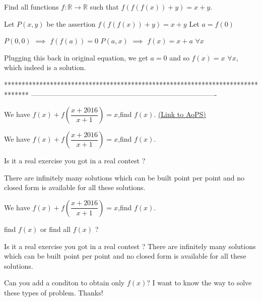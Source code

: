 \begin{solution}
	\begin{tcolorbox}Find all  functions $f: \mathbb{R}\to\mathbb{R}$ such that $f(f(f(x))+y)=x+y$.\end{tcolorbox}
Let $P(x,y)$ be the assertion $f(f(f(x))+y)=x+y$
Let $a=f(0)$

$P(0,0)$ $\implies$ $f(f(a))=0$
$P(a,x)$ $\implies$ $f(x)=x+a$  $\forall x$

Plugging this back in original equation, we get $a=0$ and so $\boxed{f(x)=x}$ $\forall x$, which indeed is a solution.
\end{solution}
*******************************************************************************
-------------------------------------------------------------------------------

\begin{problem}
	We have $f(x)+f\left(\dfrac{x+2016}{x+1}\right)=x$,find $f(x).$
	\flushright \href{https://artofproblemsolving.com/community/c6h561270}{(Link to AoPS)}
\end{problem}



\begin{solution}
	\begin{tcolorbox}We have $f(x)+f\left(\dfrac{x+2016}{x+1}\right)=x$,find $f(x).$\end{tcolorbox}
Is it a real exercise you got in a real contest ?

There are infinitely many solutions which can be built point per point and no closed form is available for all these solutions.
\end{solution}



\begin{solution}
	\begin{tcolorbox}We have $f(x)+f\left(\dfrac{x+2016}{x+1}\right)=x$,find $f(x).$\end{tcolorbox}

find $f(x)$ or find all $f(x)$ ?
\end{solution}



\begin{solution}
	\begin{tcolorbox}Is it a real exercise you got in a real contest ?
There are infinitely many solutions which can be built point per point and no closed form is available for all these solutions.\end{tcolorbox}
Can you add a conditon to obtain only $f(x)$?
I want to know the way to solve these types of problem. Thanks!
\end{solution}



